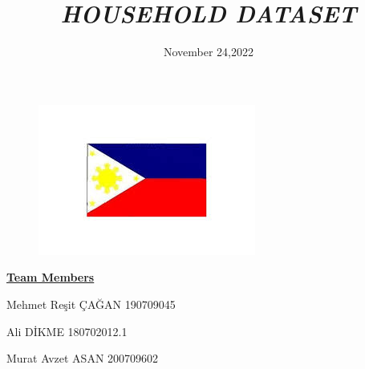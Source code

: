 \documentclass[12 pt]{article}
\title{\textbf{\textit{HOUSEHOLD DATASET}}}
\author{}
\date{November 24,2022}
\begin{document}
\begin{figure}[t]
    \centering
    \includegraphics[scale=0.42]{filipinbayrak.jpg}
    \label{fig:my_label}
\end{figure}
\maketitle
\begin{center}
\begin{huge}
\underline{\textbf{Team Members}}
\end{huge}
\end{center}

\begin{large}
\begin{center}
\begin{large}Mehmet Reşit ÇAĞAN     190709045\\ \end{large}
\begin{large}Ali DİKME              180702012.1\\  \end{large}
\begin{large} Murat Avzet ASAN        200709602\\ \end{large}
\end{center}
\end{large}
\newpage
\end{document}
